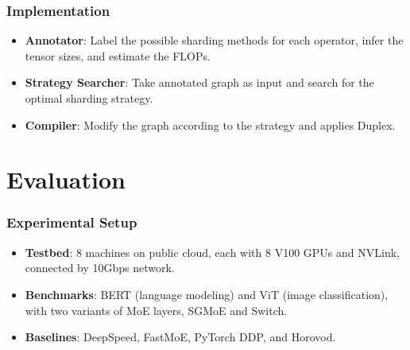 \documentclass[12pt,aspectratio=169]{beamer}
\begin{document}
    \begin{frame}
        \frametitle{Implementation}

        \begin{itemize}
            \setlength{\itemsep}{.8em}
            \item \textbf{Annotator}: Label the possible sharding methods for each operator, infer the tensor sizes, and estimate the FLOPs.
            \item \textbf{Strategy Searcher}: Take annotated graph as input and search for the optimal sharding strategy.
            \item \textbf{Compiler}: Modify the graph according to the strategy and applies Duplex.
        \end{itemize}

    \end{frame}

    \section{Evaluation}

    \begin{frame}
        \frametitle{Experimental Setup}

        \begin{itemize}
            \setlength{\itemsep}{.5em}
            \item \textbf{Testbed}: 8 machines on public cloud, each with 8 V100 GPUs and NVLink, connected by 10Gbps network.
            \item \textbf{Benchmarks}: BERT (language modeling) and ViT (image classification), with two variants of MoE layers, SGMoE and Switch.
            \item \textbf{Baselines}: DeepSpeed, FastMoE, PyTorch DDP, and Horovod.
        \end{itemize}
    \end{frame}
\end{document}
